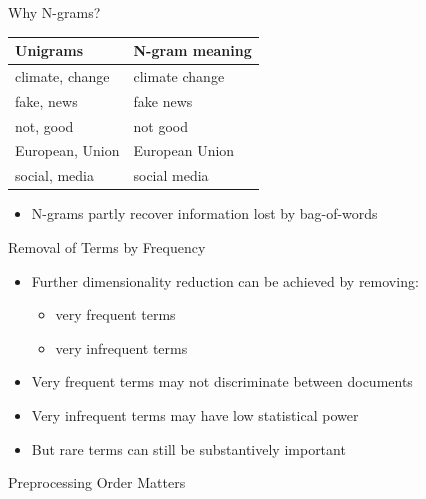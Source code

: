 \documentclass[11pt,aspectratio=43]{beamer}
\begin{document}
\begin{frame}{Why N-grams?}
\centering
\begin{tabular}{ll}
\toprule
\textbf{Unigrams} & \textbf{N-gram meaning}\\ \midrule
climate, change & climate change\\
fake, news & fake news\\
not, good & not good\\
European, Union & European Union\\
social, media & social media\\
\bottomrule
\end{tabular}
\vspace{1em}
\begin{itemize}\item N-grams partly recover information lost by bag-of-words\end{itemize}
\end{frame}

\begin{frame}{Removal of Terms by Frequency}
\begin{itemize}
\item Further dimensionality reduction can be achieved by removing:
  \begin{itemize}
  \item very frequent terms
  \item very infrequent terms
  \end{itemize}
\item Very frequent terms may not discriminate between documents
\item Very infrequent terms may have low statistical power
\item But rare terms can still be substantively important
\end{itemize}
\end{frame}

\begin{frame}{Preprocessing Order Matters}
\centering
{}
\end{frame}
\end{document}
